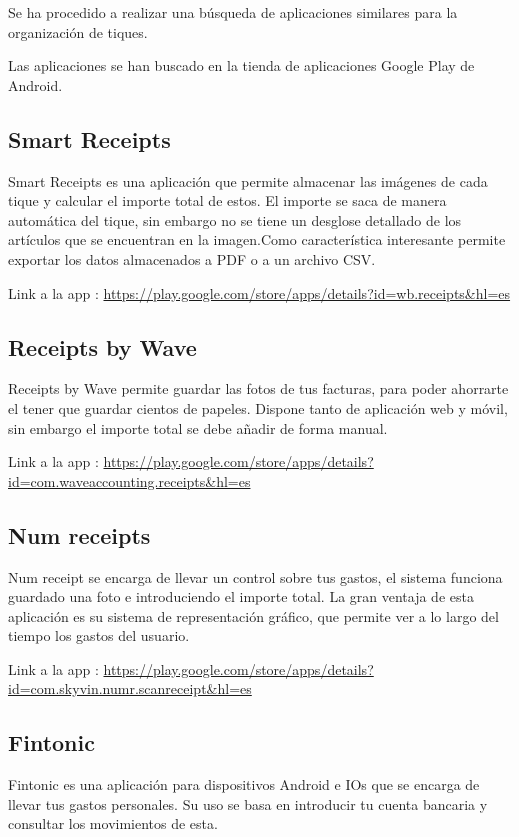 
Se ha procedido a realizar una búsqueda de aplicaciones similares para la organización de tiques.

Las aplicaciones se han buscado en la tienda de aplicaciones Google Play de Android.

\subsection{Smart Receipts}
Smart Receipts es una aplicación que permite almacenar las imágenes de cada tique y calcular el importe total de estos.
El importe se saca de manera automática del tique, sin embargo no se tiene un desglose detallado de los artículos que se encuentran en la imagen.Como característica interesante permite exportar los datos almacenados a PDF o a un archivo CSV.

Link a la app : \url{https://play.google.com/store/apps/details?id=wb.receipts&hl=es} 

\subsection{Receipts by Wave}
Receipts by Wave permite guardar las fotos de tus  facturas, para poder ahorrarte el tener que guardar cientos de papeles.
Dispone tanto de aplicación web y móvil, sin embargo el importe total se debe añadir de forma manual.

Link a la app : \url{https://play.google.com/store/apps/details?id=com.waveaccounting.receipts&hl=es} 

\subsection{Num receipts}
Num receipt se encarga de llevar un control sobre tus gastos, el sistema funciona guardado una foto e introduciendo el importe total.
La gran ventaja de esta aplicación es su sistema de representación gráfico, que permite ver a lo largo del tiempo los gastos del usuario.

Link a la app : \url{https://play.google.com/store/apps/details?id=com.skyvin.numr.scanreceipt&hl=es} 

\subsection{Fintonic}
Fintonic es una aplicación para dispositivos Android e IOs que se encarga de llevar tus gastos personales. Su uso se basa en introducir tu cuenta bancaria y consultar los movimientos de esta.

